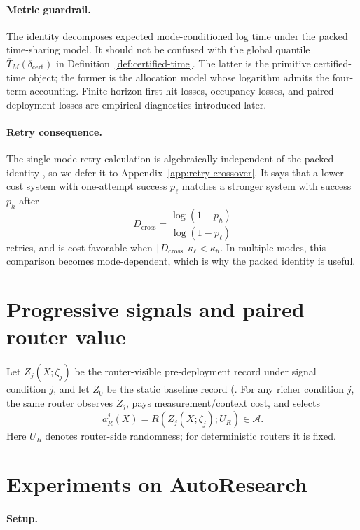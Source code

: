 \documentclass{article}
\newcommand{\cA}{\mathcal{A}}
\begin{document}
\paragraph{Metric guardrail.}
The identity decomposes expected mode-conditioned log time under the packed time-sharing
model.  It should not be confused with the global quantile
\(\overline T_M(\delta_{\mathrm{cert}})\) in Definition~\ref{def:certified-time}.  The latter is the
primitive certified-time object; the former is the allocation model whose logarithm admits
the four-term accounting.  Finite-horizon first-hit losses, occupancy losses, and paired
deployment losses are empirical diagnostics introduced later.

\paragraph{Retry consequence.}
The single-mode retry calculation is algebraically independent of the packed identity , so we defer it to Appendix~\ref{app:retry-crossover}.  It says that a lower-cost system with one-attempt success \(p_\ell\) matches a stronger system with success \(p_h\) after
\[
    D_{\mathrm{cross}}=\frac{\log(1-p_h)}{\log(1-p_\ell)}
\]
retries, and is cost-favorable when \(\lceil D_{\mathrm{cross}}\rceil\kappa_\ell<\kappa_h\).  In multiple modes, this comparison becomes mode-dependent, which is why the packed identity is useful.

\section{Progressive signals and paired router value}
\label{subsec:paired}

Let \(Z_j(X;\zeta_j)\) be the router-visible pre-deployment record under signal condition
\(j\), and let \(Z_0\) be the static baseline record (.  For any richer condition \(j\), the same
router observes \(Z_j\), pays measurement/context cost, and selects
\[
    a_R^j(X)=R(Z_j(X;\zeta_j);U_R)\in\cA .
\]
Here \(U_R\) denotes router-side randomness; for deterministic routers it is fixed.

\section{Experiments on AutoResearch}
\label{sec:experiments}

\paragraph{Setup.}
\end{document}
